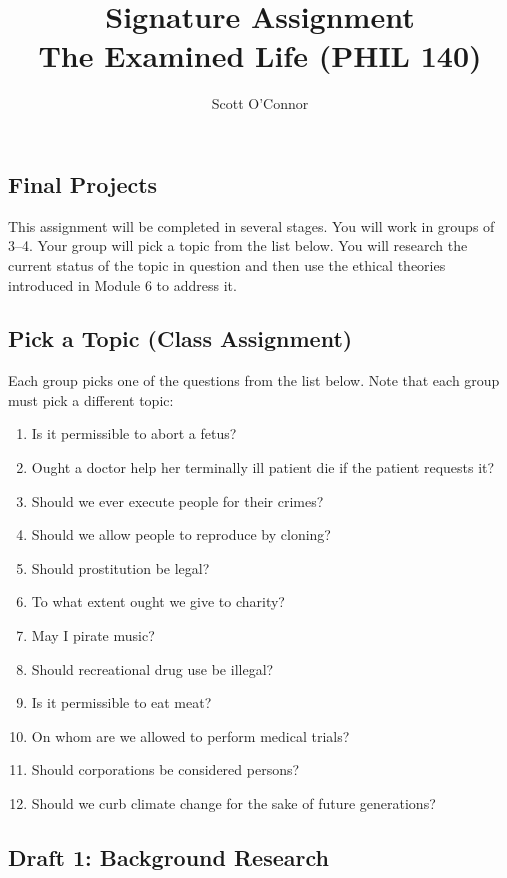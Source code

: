 \documentclass[10pt]{article}
\title{Signature Assignment \\ The Examined Life (PHIL 140)}
\author{Scott O’Connor}
\providecommand{\tightlist}{%
  \setlength{\itemsep}{0pt}\setlength{\parskip}{0pt}}
\begin{document}
\maketitle

\subsection{Final Projects}\label{final-projects}

This assignment will be completed in several stages. You will work in groups of 3--4.
Your group will pick a topic from the list below. You will research the
current status of the topic in question and then use the ethical
theories introduced in Module 6 to address it.

\subsection{Pick a Topic (Class
Assignment)}\label{pick-a-topic-class-assignment}

Each group picks one of the questions from the list below. Note that
each group must pick a different topic:

\begin{enumerate}
\def\labelenumi{\arabic{enumi}.}
\tightlist
\item
  Is it permissible to abort a fetus?
\item
  Ought a doctor help her terminally ill patient die if the patient
  requests it?
\item
  Should we ever execute people for their crimes?
\item
  Should we allow people to reproduce by cloning?
\item
  Should prostitution be legal?
\item
  To what extent ought we give to charity?
\item
  May I pirate music?
\item
  Should recreational drug use be illegal?
\item
  Is it permissible to eat meat?
\item
  On whom are we allowed to perform medical trials?
\item
  Should corporations be considered persons?
\item
  Should we curb climate change for the sake of future generations?
\end{enumerate}

\subsection{Draft 1: Background
Research}\label{draft-1-background-research}
\end{document}
